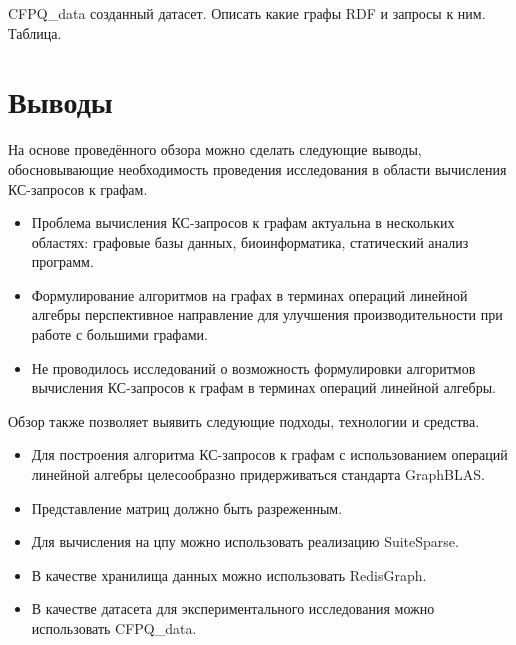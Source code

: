 CFPQ\_data созданный датасет. Описать какие графы RDF и запросы к ним. Таблица.

\section{Выводы}\label{sec:ch1/sec6}
На основе проведённого обзора можно сделать следующие выводы, обосновывающие необходимость проведения исследования в области вычисления КС-запросов к графам.
\begin{itemize}
	\item Проблема вычисления КС-запросов к графам актуальна в нескольких областях: графовые базы данных, биоинформатика, статический анализ программ.
	\item Формулирование алгоритмов на графах в терминах операций линейной алгебры перспективное направление для улучшения производительности при работе с большими графами.
	\item Не проводилось исследований о возможность формулировки алгоритмов вычисления КС-запросов к графам в терминах операций линейной алгебры.
\end{itemize}

Обзор также позволяет выявить следующие подходы, технологии и средства.
\begin{itemize}
	\item Для построения алгоритма КС-запросов к графам с использованием операций линейной алгебры целесообразно придерживаться стандарта GraphBLAS.
	\item Представление матриц должно быть разреженным.
	\item Для вычисления на цпу можно использовать реализацию SuiteSparse.
	\item В качестве хранилища данных можно использовать RedisGraph.
	\item В качестве датасета для экспериментального исследования можно использовать CFPQ\_data.
\end{itemize}


\FloatBarrier
